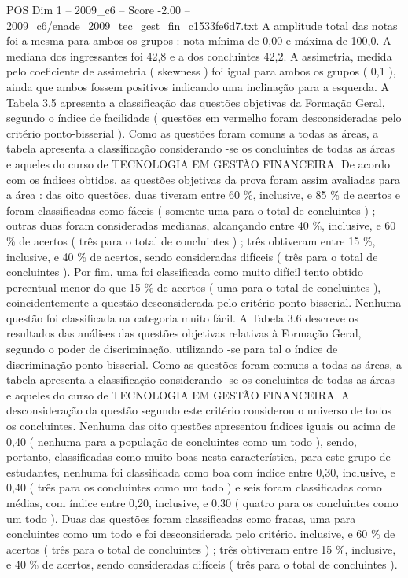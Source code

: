 \begin{textsample}{POS Dim 1 – 2009\_c6 – Score -2.00 – 2009\_c6/enade\_2009\_tec\_gest\_fin\_c1533fe6d7.txt}
A amplitude total das notas foi a mesma para ambos os grupos : nota mínima de 0,00 e máxima de 100,0.
A mediana dos ingressantes foi 42,8 e a dos concluintes 42,2.
A assimetria, medida pelo coeficiente de assimetria ( skewness ) foi igual para ambos os grupos ( 0,1 ), ainda que ambos fossem positivos indicando uma inclinação para a esquerda.
A Tabela 3.5 apresenta a classificação das questões objetivas da Formação Geral, segundo o índice de facilidade ( questões em vermelho foram desconsideradas pelo critério ponto-bisserial ).
Como as questões foram comuns a todas as áreas, a tabela apresenta a classificação considerando -se os concluintes de todas as áreas e aqueles do curso de TECNOLOGIA EM GESTÃO FINANCEIRA.
De acordo com os índices obtidos, as questões objetivas da prova foram assim avaliadas para a área : das oito questões, duas tiveram entre 60 \%, inclusive, e 85 \% de acertos e foram classificadas como fáceis ( somente uma para o total de concluintes ) ; outras duas foram consideradas medianas, alcançando entre 40 \%, inclusive, e 60 \% de acertos ( três para o total de concluintes ) ; três obtiveram entre 15 \%, inclusive, e 40 \% de acertos, sendo consideradas difíceis ( três para o total de concluintes ).
Por fim, uma foi classificada como muito difícil tento obtido percentual menor do que 15 \% de acertos ( uma para o total de concluintes ), coincidentemente a questão desconsiderada pelo critério ponto-bisserial.
Nenhuma questão foi classificada na categoria muito fácil.
A Tabela 3.6 descreve os resultados das análises das questões objetivas relativas à Formação Geral, segundo o poder de discriminação, utilizando -se para tal o índice de discriminação ponto-bisserial.
Como as questões foram comuns a todas as áreas, a tabela apresenta a classificação considerando -se os concluintes de todas as áreas e aqueles do curso de TECNOLOGIA EM GESTÃO FINANCEIRA.
A desconsideração da questão segundo este critério considerou o universo de todos os concluintes.
Nenhuma das oito questões apresentou índices iguais ou acima de 0,40 ( nenhuma para a população de concluintes como um todo ), sendo, portanto, classificadas como muito boas nesta característica, para este grupo de estudantes, nenhuma foi classificada como boa com índice entre 0,30, inclusive, e 0,40 ( três para os concluintes como um todo ) e seis foram classificadas como médias, com índice entre 0,20, inclusive, e 0,30 ( quatro para os concluintes como um todo ).
Duas das questões foram classificadas como fracas, uma para concluintes como um todo e foi desconsiderada pelo critério. inclusive, e 60 \% de acertos ( três para o total de concluintes ) ; três obtiveram entre 15 \%, inclusive, e 40 \% de acertos, sendo consideradas difíceis ( três para o total de concluintes ).

\end{textsample}
